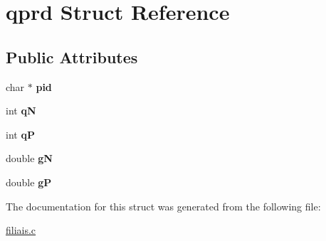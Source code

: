 \hypertarget{structqprd}{}\section{qprd Struct Reference}
\label{structqprd}
\subsection*{Public Attributes}
\begin{DoxyCompactItemize}
\item 
\mbox{\label{structqprd_abedcf4ae333edcd9459c465ae54e1516}} 
char $\ast$ {\bfseries pid}
\item 
\mbox{\label{structqprd_a319485158a8384134df4c7b9c4765296}} 
int {\bfseries qN}
\item 
\mbox{\label{structqprd_a87236da95deac1b42e3ac9b3d42d8f57}} 
int {\bfseries qP}
\item 
\mbox{\label{structqprd_a437795ceda0ff87bb01579c64d44b7a7}} 
double {\bfseries gN}
\item 
\mbox{\label{structqprd_a75c8fcf02e25e6b2f15c0d17645c1881}} 
double {\bfseries gP}
\end{DoxyCompactItemize}


The documentation for this struct was generated from the following file\+:\begin{DoxyCompactItemize}
\item 
\hyperlink{filiais_8c}{filiais.\+c}\end{DoxyCompactItemize}
